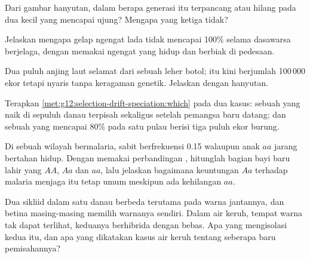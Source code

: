 \begin{exercise}[$\star\star$]\label{exo:g12:selection-drift-speciation:8}
Dari gambar hanyutan, dalam berapa generasi  itu terpancang atau
hilang pada dua  kecil yang mencapai ujung? Mengapa yang
ketiga tidak?
\end{exercise}

\begin{exercise}[$\star\star$]\label{exo:g12:selection-drift-speciation:9}
Jelaskan mengapa  gelap ngengat lada tidak mencapai 100\% selama
dasawarsa berjelaga, dengan memakai ngengat yang hidup dan berbiak di
pedesaan.
\end{exercise}

\begin{exercise}[$\star\star$]\label{exo:g12:selection-drift-speciation:10}
Dua puluh anjing laut selamat dari sebuah leher botol;  itu
kini berjumlah 100\,000 ekor tetapi nyaris tanpa keragaman genetik.
Jelaskan dengan hanyutan.
\end{exercise}

\begin{exercise}[$\star\star$]\label{exo:g12:selection-drift-speciation:11}
Terapkan \cref{met:g12:selection-drift-speciation:which} pada dua
kasus: sebuah  yang naik di sepuluh  danau terpisah
sekaligus setelah pemangsa baru datang; dan sebuah  yang mencapai
80\% pada satu  pulau berisi tiga puluh ekor burung.
\end{exercise}

\begin{exercise}[$\star\star\star$]\label{exo:g12:selection-drift-speciation:12}
Di sebuah wilayah bermalaria,  sabit berfrekuensi 0.15
walaupun anak $aa$ jarang bertahan hidup. Dengan memakai perbandingan
, hitunglah bagian bayi baru lahir yang $AA$, $Aa$ dan $aa$,
lalu jelaskan bagaimana keuntungan $Aa$ terhadap malaria menjaga 
itu tetap umum meskipun ada kehilangan $aa$.
\end{exercise}

\begin{exercise}[$\star\star\star$]\label{exo:g12:selection-drift-speciation:13}
Dua  sikliid dalam satu danau berbeda terutama pada warna
jantannya, dan betina masing-masing memilih warnanya sendiri. Dalam
air keruh, tempat warna tak dapat terlihat, keduanya berhibrida dengan
bebas. Apa yang mengisolasi kedua  itu, dan apa yang dikatakan
kasus air keruh tentang seberapa baru pemisahannya?
\end{exercise}

